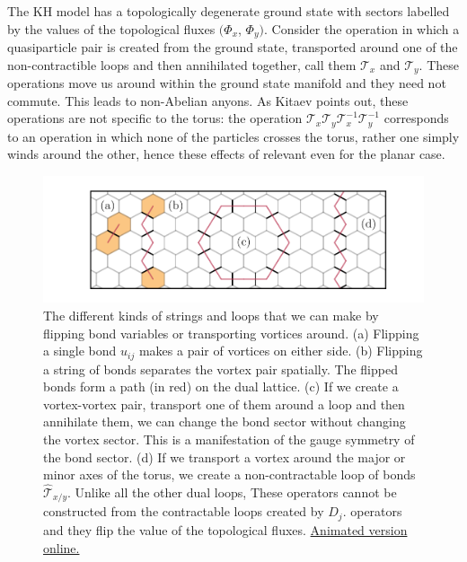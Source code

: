 The KH model has a topologically degenerate ground state with sectors labelled by the values of the topological fluxes \((\Phi_x\), \(\Phi_y)\). Consider the operation in which a quasiparticle pair is created from the ground state, transported around one of the non-contractible loops and then annihilated together, call them \(\mathcal{T}_{x}\) and \(\mathcal{T}_{y}\). These operations move us around within the ground state manifold and they need not commute. This leads to non-Abelian anyons. As Kitaev points out, these operations are not specific to the torus: the operation \(\mathcal{T}_{x}\mathcal{T}_{y}\mathcal{T}_{x}^{-1}\mathcal{T}_{y}^{-1}\) corresponds to an operation in which none of the particles crosses the torus, rather one simply winds around the other, hence these effects of relevant even for the planar case.

\hypertarget{fig:types_of_dual_loops_animated}{%
\begin{figure}
\centering
\includegraphics[width=1\textwidth,height=\textheight]{figure_code/amk_chapter/intro/types_of_dual_loops_animated/types_of_dual_loops_animated}
\caption[{Dual Loops and Vortex Pairs}]{The different kinds of strings and loops that we can make by flipping bond variables or transporting vortices around. (a) Flipping a single bond \(u_{ij}\) makes a pair of vortices on either side. (b) Flipping a string of bonds separates the vortex pair spatially. The flipped bonds form a path (in red) on the dual lattice. (c) If we create a vortex-vortex pair, transport one of them around a loop and then annihilate them, we can change the bond sector without changing the vortex sector. This is a manifestation of the gauge symmetry of the bond sector. (d) If we transport a vortex around the major or minor axes of the torus, we create a non-contractable loop of bonds \(\hat{\mathcal{T}}_{x/y}\). Unlike all the other dual loops, These operators cannot be constructed from the contractable loops created by \(D_j\). operators and they flip the value of the topological fluxes. \href{http://thomashodson.com/assets/thesis/figure_code/amk_chapter/intro/types_of_dual_loops_animated/types_of_dual_loops_animated.gif}{ Animated version online.}}
\label{fig:types_of_dual_loops_animated}
\end{figure}
}

